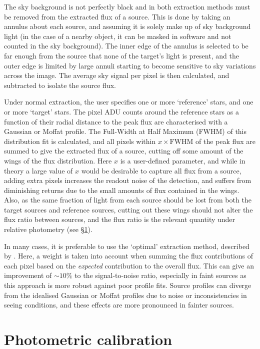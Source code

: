 The sky background is not perfectly black and in both extraction methods must be removed from the extracted flux of a source. This is done by taking an annulus about each source, and assuming it is solely make up of sky background light (in the case of a nearby object, it can be masked in software and not counted in the sky background). The inner edge of the annulus is selected to be far enough from the source that none of the target's light is present, and the outer edge is limited by large annuli starting to become sensitive to sky variations across the image. The average sky signal per pixel is then calculated, and subtracted to isolate the source flux.

Under normal extraction, the user specifies one or more `reference' stars, and one or more `target' stars. The pixel ADU counts around the reference stars as a function of their radial distance to the peak flux are characterised with a Gaussian or Moffat profile. The Full-Width at Half Maximum (FWHM) of this distribution fit is calculated, and all pixels within $x \times \mathrm{FWHM}$ of the peak flux are summed to give the extracted flux of a source, cutting off some amount of the wings of the flux distribution. Here $x$ is a user-defined parameter, and while in theory a large value of $x$ would be desirable to capture all flux from a source, adding extra pixels increases the readout noise of the detection, and suffers from diminishing returns due to the small amounts of flux contained in the wings.
Also, as the same fraction of light from each source should be lost from both the target sources and reference sources, cutting out these wings should not alter the flux ratio between sources, and the flux ratio is the relevant quantity under relative photometry (see \S\ref{sect:observations:photometric extraction and calibration}).

In many cases, it is preferable to use the `optimal' extraction method, described by \citet{naylor1998}. Here, a weight is taken into account when summing the flux contributions of each pixel based on the {\it expected} contribution to the overall flux. This can give an improvement of $\sim 10\%$ to the signal-to-noise ratio, especially in faint sources as this approach is more robust against poor profile fits. Source profiles can diverge from the idealised Gaussian or Moffat profiles due to noise or inconsistencies in seeing conditions, and these effects are more pronounced in fainter sources.



\section{Photometric calibration}
\label{sect:observations:photometric extraction and calibration}

